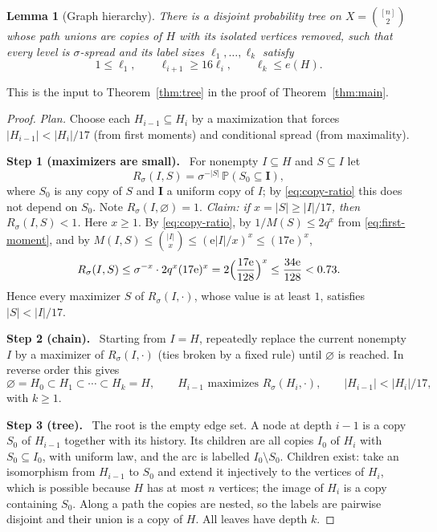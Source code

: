 \documentclass[11pt]{article}
\newtheorem{lemma}[theorem]{Lemma}
\numberwithin{equation}{section}
\newcommand{\PP}{\mathbb P}
\newcommand{\ee}{\mathrm e}
\newcommand{\step}[1]{\par\smallskip\noindent\textbf{Step #1.}\ }
\begin{document}
\begin{lemma}[Graph hierarchy]\label{lem:hierarchy}
There is a disjoint probability tree on $X=\binom{[n]}2$ whose path
unions are copies of $H$ with its isolated vertices removed, such that
every level is $\sigma$-spread and its label sizes
$\ell_1,\ldots,\ell_k$ satisfy
\[
 1\le\ell_1,\qquad\ell_{i+1}\ge16\ell_i,\qquad\ell_k\le e(H).
\]
\end{lemma}

This is the input to Theorem~\ref{thm:tree} in the proof of
Theorem~\ref{thm:main}.

\begin{proof}
\emph{Plan.} Choose each $H_{i-1}\subseteq H_i$ by a maximization that
forces $|H_{i-1}|<|H_i|/17$ (from first moments) and conditional spread
(from maximality).

\step{1 (maximizers are small)} For nonempty $I\subseteq H$ and
$S\subseteq I$ let
\begin{equation}\label{eq:maximizer}
 R_\sigma(I,S)=\sigma^{-|S|}\,\PP(S_0\subseteq\boldsymbol I),
\end{equation}
where $S_0$ is any copy of $S$ and $\boldsymbol I$ a uniform copy of $I$;
by \eqref{eq:copy-ratio} this does not depend on $S_0$. Note
$R_\sigma(I,\varnothing)=1$. \emph{Claim: if $x=|S|\ge|I|/17$, then
$R_\sigma(I,S)<1$.} Here $x\ge1$. By \eqref{eq:copy-ratio}, by
$1/M(S)\le2q^x$ from \eqref{eq:first-moment}, and by
$M(I,S)\le\binom{|I|}{x}\le(\ee|I|/x)^x\le(17\ee)^x$,
\[
 R_\sigma(I,S)\le\sigma^{-x}\cdot2q^x(17\ee)^x
 =2\Bigl(\frac{17\ee}{128}\Bigr)^x\le\frac{34\ee}{128}<0.73.
\]
Hence every maximizer $S$ of $R_\sigma(I,\cdot)$, whose value is at least
$1$, satisfies $|S|<|I|/17$.

\step{2 (chain)} Starting from $I=H$, repeatedly replace the current
nonempty $I$ by a maximizer of $R_\sigma(I,\cdot)$ (ties broken by a
fixed rule) until $\varnothing$ is reached. In reverse order this gives
\[
 \varnothing=H_0\subset H_1\subset\cdots\subset H_k=H,\qquad
 H_{i-1}\text{ maximizes }R_\sigma(H_i,\cdot),\qquad
 |H_{i-1}|<|H_i|/17,
\]
with $k\ge1$.

\step{3 (tree)} The root is the empty edge set. A node at depth $i-1$ is
a copy $S_0$ of $H_{i-1}$ together with its history. Its children are all
copies $I_0$ of $H_i$ with $S_0\subseteq I_0$, with uniform law, and the
arc is labelled $I_0\setminus S_0$. Children exist: take an isomorphism
from $H_{i-1}$ to $S_0$ and extend it injectively to the vertices of
$H_i$, which is possible because $H$ has at most $n$ vertices; the image
of $H_i$ is a copy containing $S_0$. Along a path the copies are nested,
so the labels are pairwise disjoint and their union is a copy of $H$. All
leaves have depth $k$.


\end{proof}
\end{document}
